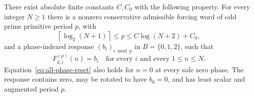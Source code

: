 \begin{theorem}
\label{thm:all-phase-synchronization}
There exist absolute finite constants $C,C_0$ with the following
property. For every integer $N\ge1$ there is a nonzero conservative
admissible forcing word of odd prime primitive period $p$, with
\begin{equation}\label{eq:sync-period-order}
 \left\lceil\log_2(N+1)\right\rceil
 \le p\le C\log(N+2)+C_0,
\end{equation}
and a phase-indexed response $(b_i)_{i\bmod p}$ in $B=\{0,1,2\}$,
such that
\begin{equation}\label{eq:all-phase-reset}
 F_{d,i}^{(p)}(n)=b_i
 \quad\text{for every }i\text{ and every }1\le n\le N.
\end{equation}
Equation~\eqref{eq:all-phase-reset} also holds for $n=0$ at
every safe zero phase. The response contains zero, may be rotated
to have $b_0=0$, and has least scalar and augmented period $p$.
\end{theorem}
